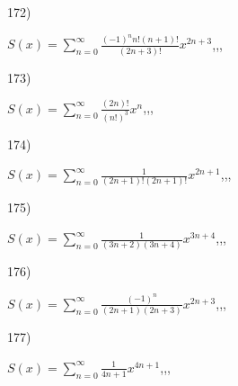 \documentclass[11pt, ukrainian]{article}
\begin{document}
\par
\vspace{0.9cm}
172) \space 
{%
{$S(x)=\sum\limits_{n=0}^{\infty}{\frac{{(-1)^n}n!(n+1)!}{(2n+3)!}}{x^{{2n+3}}}$},,, \par \smallskip  
}
\par
\vspace{0.9cm}
173) \space 
{%
{$S(x)=\sum\limits_{n=0}^{\infty}{\frac{(2n)!}{(n!)^3}}{x^{{n}}}$},,, \par \smallskip  
}
\par
\vspace{0.9cm}
174) \space 
{%
{$S(x)=\sum\limits_{n=0}^{\infty}{\frac{1}{(2n+1)!(2n+1)!}}{x^{{2n+1}}}$},,, \par \smallskip  
}
\par
\vspace{0.9cm}
175) \space 
{%
{$S(x)=\sum\limits_{n=0}^{\infty}{\frac{1}{(3n+2)(3n+4)}}{x^{{3n+4}}}$},,, \par \smallskip  
}
\par
\vspace{0.9cm}
176) \space 
{%
{$S(x)=\sum\limits_{n=0}^{\infty}{\frac{(-1)^n}{(2n+1)(2n+3)}}{x^{{2n+3}}}$},,, \par \smallskip  
}
\par
\vspace{0.9cm}
177) \space 
{%
{$S(x)=\sum\limits_{n=0}^{\infty}{\frac{1}{4n+1}}{x^{{4n+1}}}$},,, \par \smallskip  
}
\end{document}
